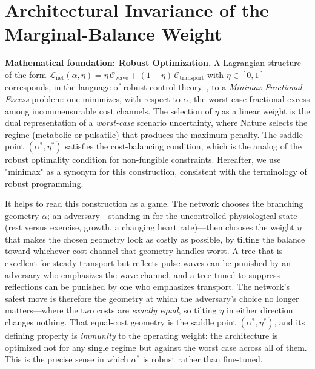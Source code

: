 
\section{Architectural Invariance of the \texorpdfstring{Marginal-Balance Weight}{Marginal-Balance Weight}}
\label{sec:arch}

\textbf{Mathematical foundation: Robust Optimization.} A Lagrangian structure of
the form $\mathcal{L}_{\mathrm{net}}(\alpha,\eta) =
\eta\,\mathcal{C}_{\mathrm{wave}} + (1-\eta)\,\mathcal{C}_{\mathrm{transport}}$
with $\eta\in[0,1]$ corresponds, in the language of robust control
theory~\cite{ben-tal2009}, to a \emph{Minimax Fractional Excess} problem: one
minimizes, with respect to $\alpha$, the worst-case fractional excess among
incommensurable cost channels. The selection of $\eta$ as a linear weight is the
dual representation of a \emph{worst-case} scenario uncertainty, where Nature
selects the regime (metabolic or pulsatile) that produces the maximum penalty.
The saddle point $(\alpha^*,\eta^*)$ satisfies the cost-balancing condition,
which is the analog of the robust optimality condition for non-fungible
constraints. Hereafter, we use "minimax" as a synonym for this construction,
consistent with the terminology of robust programming.

It helps to read this construction as a game. The network chooses the
branching geometry $\alpha$; an adversary---standing in for the uncontrolled
physiological state (rest versus exercise, growth, a changing heart rate)---then
chooses the weight $\eta$ that makes the chosen geometry look as costly as
possible, by tilting the balance toward whichever cost channel that geometry
handles worst. A tree that is excellent for steady transport but reflects pulse
waves can be punished by an adversary who emphasizes the wave channel, and a
tree tuned to suppress reflections can be punished by one who emphasizes
transport. The network's safest move is therefore the geometry at which the
adversary's choice no longer matters---where the two costs are \emph{exactly
equal}, so tilting $\eta$ in either direction changes nothing. That equal-cost
geometry is the saddle point $(\alpha^*,\eta^*)$, and its defining property is
\emph{immunity} to the operating weight: the architecture is optimized not for
any single regime but against the worst case across all of them. This is the
precise sense in which $\alpha^*$ is robust rather than fine-tuned.

